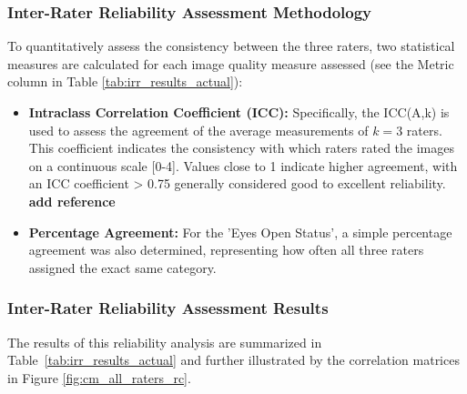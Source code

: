 \subsubsection{Inter-Rater Reliability Assessment Methodology}
\label{sssec:irr_methodology}
To quantitatively assess the consistency between the three raters, two statistical measures are calculated for each image quality measure assessed (see the Metric column in Table \ref{tab:irr_results_actual}):
\begin{itemize}
    \item \textbf{Intraclass Correlation Coefficient (ICC):} Specifically, the ICC(A,k) is used to assess the agreement of the average measurements of $k=3$ raters. This coefficient indicates the consistency with which raters rated the images on a continuous scale [0-4]. Values close to 1 indicate higher agreement, with an ICC coefficient > 0.75 generally considered good to excellent reliability. \textbf{add reference}
    \item \textbf{Percentage Agreement:} For the 'Eyes Open Status', a simple percentage agreement was also determined, representing how often all three raters assigned the exact same category.
\end{itemize}

\subsubsection{Inter-Rater Reliability Assessment Results}
\label{sssec:irr_results}

The results of this reliability analysis are summarized in Table~\ref{tab:irr_results_actual} and further illustrated by the correlation matrices in Figure \ref{fig:cm_all_raters_rc}.

\begin{table}[htbp]
\centering
\caption{Inter-Rater Reliability Metrics for Image Quality Assessments}
\label{tab:irr_results_actual}
\end{table}

